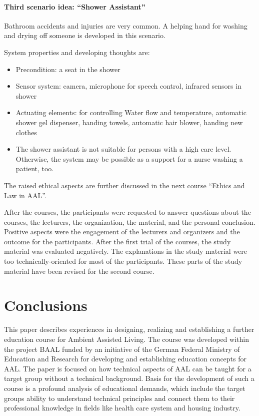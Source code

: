\documentclass[runningheads,a4paper]{llncs}
\begin{document}
\paragraph{Third scenario idea: ``Shower Assistant''\\}

Bathroom accidents and injuries are very common. A helping hand for washing and drying off someone is developed in this scenario.

System properties and developing thoughts are:
\begin{itemize}
\item Precondition: a seat in the shower
\item Sensor system: camera, microphone for speech control, infrared sensors in shower
\item Actuating elements: for controlling Water flow and temperature, automatic shower gel dispenser, handing towels,  automatic hair blower, handing new clothes
\item The shower assistant is not suitable for persons with a high care level. Otherwise, the system may be possible as a support for a nurse washing a patient, too.
\end{itemize}

The raised ethical aspects are further discussed in the next course ``Ethics and Law in AAL''.

After the courses, the participants were requested to answer questions about the courses, the lecturers, the organization, the material, and the personal conclusion.
Positive aspects were the engagement of the lecturers and organizers and the outcome for the participants. After the first trial of the courses, the study material was evaluated negatively. The explanations in the study material were too technically-oriented for most of the participants. These parts of the study material have been revised for the second course.

\section{Conclusions}
This paper describes experiences in designing, realizing and establishing a further education course for Ambient Assisted Living. The course was developed within the project BAAL funded by an initiative of the German Federal Ministry of Education and Research for developing and establishing education concepts for AAL. The paper is focused on how technical aspects of AAL can be taught for a target group without a technical background. Basis for the development of such a course is a profound analysis of educational demands, which include the target groups ability to understand technical principles and connect them to their professional knowledge in fields like health care system and housing industry.
\end{document}
